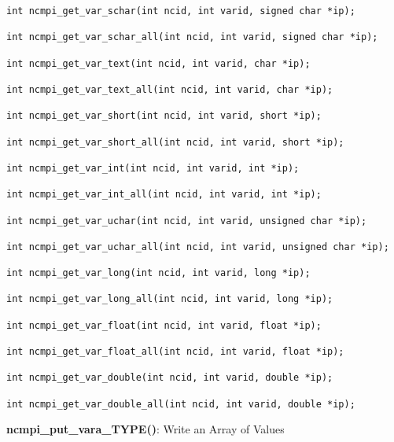 \begin{verbatim}
int ncmpi_get_var_schar(int ncid, int varid, signed char *ip);

int ncmpi_get_var_schar_all(int ncid, int varid, signed char *ip);

int ncmpi_get_var_text(int ncid, int varid, char *ip);

int ncmpi_get_var_text_all(int ncid, int varid, char *ip);

int ncmpi_get_var_short(int ncid, int varid, short *ip);

int ncmpi_get_var_short_all(int ncid, int varid, short *ip);

int ncmpi_get_var_int(int ncid, int varid, int *ip);

int ncmpi_get_var_int_all(int ncid, int varid, int *ip);

int ncmpi_get_var_uchar(int ncid, int varid, unsigned char *ip);

int ncmpi_get_var_uchar_all(int ncid, int varid, unsigned char *ip);

int ncmpi_get_var_long(int ncid, int varid, long *ip);

int ncmpi_get_var_long_all(int ncid, int varid, long *ip);

int ncmpi_get_var_float(int ncid, int varid, float *ip);

int ncmpi_get_var_float_all(int ncid, int varid, float *ip);

int ncmpi_get_var_double(int ncid, int varid, double *ip);

int ncmpi_get_var_double_all(int ncid, int varid, double *ip);
\end{verbatim}


{\bf ncmpi\_put\_vara\_TYPE()}: Write an Array of Values

